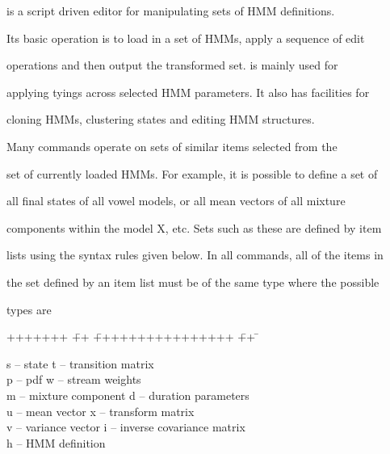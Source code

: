 

 is a script driven editor for manipulating sets of HMM definitions.


Its basic operation is to load in a set of HMMs, apply a sequence of edit


operations and then output the transformed set.  is mainly used for


applying tyings across selected HMM parameters.  It also has facilities for


cloning HMMs, clustering states and editing HMM structures.





Many  commands operate on sets of similar items selected from the


set of currently loaded HMMs.  For example, it is possible to define a set of


all final states of all vowel models, or all mean vectors of all mixture


components within the model X, etc.  Sets such as these are defined by item


lists using the syntax rules given below.  In all commands, all of the items in


the set defined by an item list must be of the same type where the possible


types are


\begin{tabbing}


+++++++ \= ++ \=  ++++++++++++++++ \= ++ \= \kill


\>  s \> -- state             \> t \> -- transition matrix \\


\>  p \> -- pdf               \> w \> -- stream weights \\


\>  m \> -- mixture component \> d \> -- duration parameters \\


\>  u \> -- mean vector       \> x \> -- transform matrix \\


\>  v \> -- variance vector   \> i \> -- inverse covariance matrix \\


\>  h \> -- HMM definition


\end{tabbing}


\noindent


